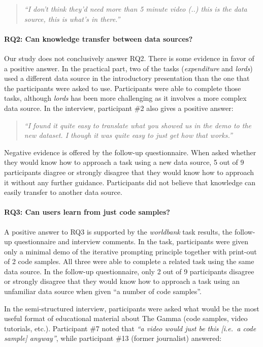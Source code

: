 \documentclass[manuscript,review,anonymous]{acmart}
\begin{document}
\begin{quote}
\emph{``I don't think they'd need more than 5 minute video (..) this is the data
  source, this is what's in there.''}
\end{quote}

\paragraph{RQ2: Can knowledge transfer between data sources?}
Our study does not conclusively answer RQ2. There is some evidence in favor of a positive answer.
In the practical part, two of the tasks (\emph{expenditure} and \emph{lords}) used a different data
source in the introductory presentation than the one that the participants were asked to use.
Participants were able to complete those tasks, although \emph{lords} has been more challenging
as it involves a more complex data source. In the interview, participant \#2 also gives a positive
answer:

\begin{quote}
\emph{``I found it quite easy to translate what you showed us in the demo to the new dataset.
   I though it was quite easy to just get how that works.''}
\end{quote}

Negative evidence is offered by the follow-up questionnaire. When asked
whether they would know how to approach a task using a new data source, 5 out of 9 participants
diagree or strongly disagree that they would know how to approach it without any further guidance.
Participants did not believe that knowledge can easily transfer to another
data source.

\paragraph{RQ3: Can users learn from just code samples?}
A positive answer to RQ3 is supported by the \emph{worldbank} task results, the follow-up questionnaire
and interview comments. In the task, participants were given only a
minimal demo of the iterative prompting principle together with print-out of 2 code samples.
All three were able to complete a related task using the same data source. In the follow-up
questionnaire, only 2 out of 9 participants disagree or strongly disagree that
they would know how to approach a task using an unfamiliar data source when given ``a number
of code samples''.

In the semi-structured interview, participants were asked what would be the most useful format
of educational material about The Gamma (code samples, video tutorials, etc.).
Participant \#7 noted that \emph{``a video would just be this [i.e.~a code sample] anyway''}, while
participant \#13 (former journalist) answered:
\end{document}
